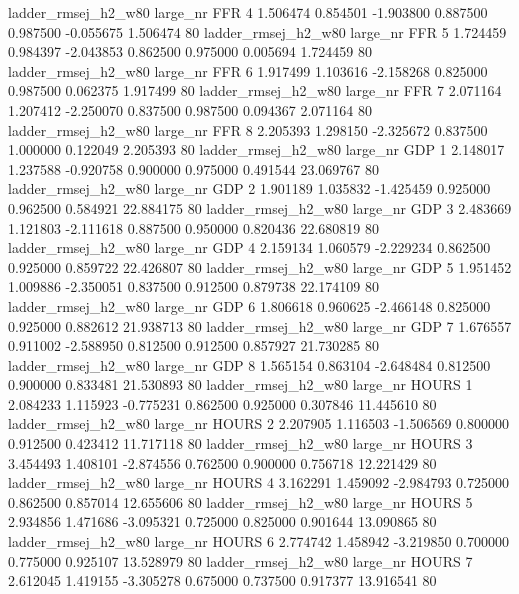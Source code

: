 ladder_rmsej_h2_w80   large_nr      FFR                 4  1.506474  0.854501  -1.903800 0.887500 0.987500 -0.055675    1.506474 80
ladder_rmsej_h2_w80   large_nr      FFR                 5  1.724459  0.984397  -2.043853 0.862500 0.975000  0.005694    1.724459 80
ladder_rmsej_h2_w80   large_nr      FFR                 6  1.917499  1.103616  -2.158268 0.825000 0.987500  0.062375    1.917499 80
ladder_rmsej_h2_w80   large_nr      FFR                 7  2.071164  1.207412  -2.250070 0.837500 0.987500  0.094367    2.071164 80
ladder_rmsej_h2_w80   large_nr      FFR                 8  2.205393  1.298150  -2.325672 0.837500 1.000000  0.122049    2.205393 80
ladder_rmsej_h2_w80   large_nr      GDP                 1  2.148017  1.237588  -0.920758 0.900000 0.975000  0.491544   23.069767 80
ladder_rmsej_h2_w80   large_nr      GDP                 2  1.901189  1.035832  -1.425459 0.925000 0.962500  0.584921   22.884175 80
ladder_rmsej_h2_w80   large_nr      GDP                 3  2.483669  1.121803  -2.111618 0.887500 0.950000  0.820436   22.680819 80
ladder_rmsej_h2_w80   large_nr      GDP                 4  2.159134  1.060579  -2.229234 0.862500 0.925000  0.859722   22.426807 80
ladder_rmsej_h2_w80   large_nr      GDP                 5  1.951452  1.009886  -2.350051 0.837500 0.912500  0.879738   22.174109 80
ladder_rmsej_h2_w80   large_nr      GDP                 6  1.806618  0.960625  -2.466148 0.825000 0.925000  0.882612   21.938713 80
ladder_rmsej_h2_w80   large_nr      GDP                 7  1.676557  0.911002  -2.588950 0.812500 0.912500  0.857927   21.730285 80
ladder_rmsej_h2_w80   large_nr      GDP                 8  1.565154  0.863104  -2.648484 0.812500 0.900000  0.833481   21.530893 80
ladder_rmsej_h2_w80   large_nr    HOURS                 1  2.084233  1.115923  -0.775231 0.862500 0.925000  0.307846   11.445610 80
ladder_rmsej_h2_w80   large_nr    HOURS                 2  2.207905  1.116503  -1.506569 0.800000 0.912500  0.423412   11.717118 80
ladder_rmsej_h2_w80   large_nr    HOURS                 3  3.454493  1.408101  -2.874556 0.762500 0.900000  0.756718   12.221429 80
ladder_rmsej_h2_w80   large_nr    HOURS                 4  3.162291  1.459092  -2.984793 0.725000 0.862500  0.857014   12.655606 80
ladder_rmsej_h2_w80   large_nr    HOURS                 5  2.934856  1.471686  -3.095321 0.725000 0.825000  0.901644   13.090865 80
ladder_rmsej_h2_w80   large_nr    HOURS                 6  2.774742  1.458942  -3.219850 0.700000 0.775000  0.925107   13.528979 80
ladder_rmsej_h2_w80   large_nr    HOURS                 7  2.612045  1.419155  -3.305278 0.675000 0.737500  0.917377   13.916541 80
